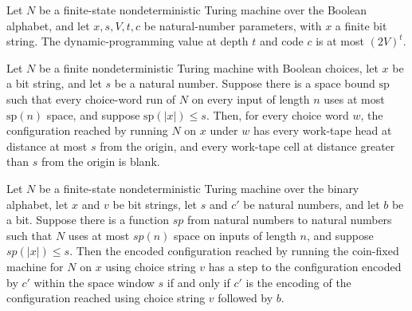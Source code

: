 \begin{theorem}
\label{Randomized.BPLInP.dpVal_le}
\leanok
{}
Let $N$ be a finite-state nondeterministic Turing machine over the Boolean alphabet, and
let $x,s,V,t,c$ be natural-number parameters, with $x$ a finite bit string. The
dynamic-programming value at depth $t$ and code $c$ is at most $(2V)^t$.
\end{theorem}

\begin{theorem}
\label{Randomized.BPLInP.inWin_run}
\leanok
{}
Let $N$ be a finite nondeterministic Turing machine with Boolean choices, let $x$ be a
bit string, and let $s$ be a natural number. Suppose there is a space bound
$\mathrm{sp}$ such that every choice-word run of $N$ on every input of length $n$ uses
at most $\mathrm{sp}(n)$ space, and suppose $\mathrm{sp}(|x|)\le s$. Then, for every
choice word $w$, the configuration reached by running $N$ on $x$ under $w$ has every
work-tape head at distance at most $s$ from the origin, and every work-tape cell at
distance greater than $s$ from the origin is blank.
\end{theorem}

\begin{theorem}
\label{Randomized.BPLInP.stepRel_iff}
\leanok
{}
Let $N$ be a finite-state nondeterministic Turing machine over the binary alphabet, let
$x$ and $v$ be bit strings, let $s$ and $c'$ be natural numbers, and let $b$ be a bit.
Suppose there is a function $sp$ from natural numbers to natural numbers such that $N$
uses at most $sp(n)$ space on inputs of length $n$, and suppose $sp(|x|)\le s$. Then the
encoded configuration reached by running the coin-fixed machine for $N$ on $x$ using
choice string $v$ has a step to the configuration encoded by $c'$ within the space
window $s$ if and only if $c'$ is the encoding of the configuration reached using choice
string $v$ followed by $b$.
\end{theorem}

